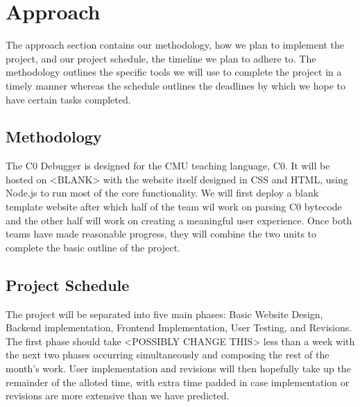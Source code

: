 \documentclass[11pt]{article}
\begin{document}
\section{Approach}
\par
The approach section contains our methodology, how we plan to implement the
project, and our project schedule, the timeline we plan to adhere to.  The
methodology outlines the specific tools we will use to complete the project in
a timely manner whereas the schedule outlines the deadlines by which we hope to
have certain tasks completed.

\subsection{Methodology}
The C0 Debugger is designed for the CMU teaching language, C0.  It will be
hosted on <BLANK> with the website itself designed in CSS and HTML, using
Node.js to run most of the core functionality.  We will first deploy a blank
template website after which half of the team wil work on parsing C0 bytecode
and the other half will work on creating a meaningful user experience.  Once
both teams have made reasonable progress, they will combine the two units to
complete the basic outline of the project.

\subsection{Project Schedule}
The project will be separated into five main phases: Basic Website Design,
Backend implementation, Frontend Implementation, User Testing, and Revisions.
The first phase should take <POSSIBLY CHANGE THIS> less than a week with the
next two phases occurring simultaneously and composing the rest of the month's
work.  User implementation and revisions will then hopefully take up the
remainder of the alloted time, with extra time padded in case implementation or
revisions are more extensive than we have predicted.
\end{document}
